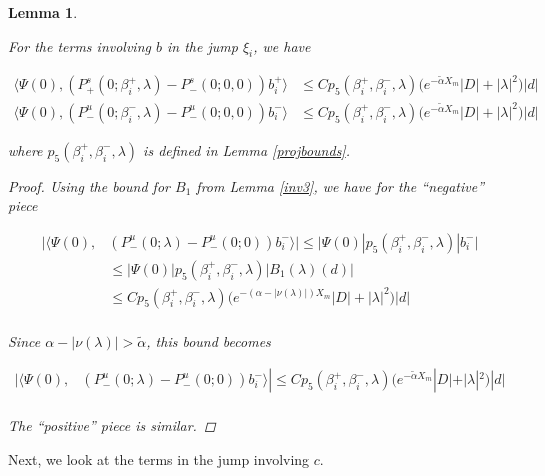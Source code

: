 \documentclass[12pt]{article}
\newtheorem{lemma}{Lemma}
\begin{document}
\begin{lemma}\label{jumpb}

For the terms involving $b$ in the jump $\xi_i$, we have

\begin{align*}
\langle \Psi(0), (P^s_+(0; \beta_i^+, \lambda) - P^s_-(0; 0, 0))b_i^+ \rangle
&\leq C p_5(\beta_i^+, \beta_i^-, \lambda) \Big( e^{-\tilde{\alpha} X_m} |D| + |\lambda|^2 \Big)|d|  \\
\langle \Psi(0), (P^u_-(0; \beta_i^-, \lambda) - P^u_-(0; 0, 0))b_i^- \rangle
&\leq C p_5(\beta_i^+, \beta_i^-, \lambda) \Big( e^{-\tilde{\alpha} X_m} |D| + |\lambda|^2 \Big)|d|
\end{align*}

where $p_5(\beta_i^+, \beta_i^-, \lambda)$ is defined in Lemma \ref{projbounds}.

\begin{proof}

Using the bound for $B_1$ from Lemma \ref{inv3}, we have for the ``negative'' piece

\begin{align*}
|\langle \Psi(0), &(P^u_-(0; \lambda) - P^u_-(0; 0))b_i^- \rangle|
\leq |\Psi(0)| p_5(\beta_i^+, \beta_i^-, \lambda)|b_i^-| \\
&\leq |\Psi(0)| p_5(\beta_i^+, \beta_i^-, \lambda)|B_1(\lambda)(d)| \\
&\leq C p_5(\beta_i^+, \beta_i^-, \lambda) \Big( e^{-(\alpha - |\nu(\lambda)|) X_m} |D| 
+ |\lambda|^2 \Big)|d|\\
\end{align*}

Since $\alpha - |\nu(\lambda)| > \tilde{\alpha}$, this bound becomes

\begin{align*}
|\langle \Psi(0), &(P^u_-(0; \lambda) - P^u_-(0; 0))b_i^- \rangle|
\leq C p_5(\beta_i^+, \beta_i^-, \lambda) \Big( e^{-\tilde{\alpha} X_m} |D| + |\lambda|^2 \Big)|d|\\
\end{align*}

The ``positive'' piece is similar.

\end{proof}
\end{lemma}

Next, we look at the terms in the jump involving $c$.

\end{document}
